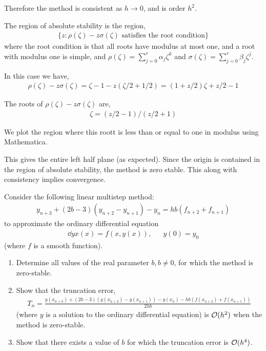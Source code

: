 \documentclass[10pt]{article}
\begin{document}
\begin{solution}[Solution]
\begin{itemize}
Therefore the method is consistent as \( h\to 0 \), and is order \( h^2 \).

The region of absolute stability is the region,
\begin{align*}
    \{ z : \rho(\zeta) - z\sigma(\zeta) \text{ satisfies the root condition} \}
\end{align*}
    where the root condition is that all roots have modulus at most one, and a root with modulus one is simple, and \( \rho(\zeta) = \sum_{j=0}^{r} \alpha_j\zeta^k \) and \( \sigma(\zeta) = \sum_{j=0}^{r} \beta_j \zeta^j \).

In this case we have,
\begin{align*}
    \rho(\zeta) - z\sigma(\zeta) =  \zeta -1 - z(\zeta/2+1/2) = (1+z/2)\zeta + z/2-1
\end{align*}

The roots of \( \rho(\zeta) - z\sigma(\zeta) \) are,
\begin{align*}
    \zeta = ( z/2-1 ) / (z/2+1)
\end{align*}

We plot the region where this roott is less than or equal to one in modulus using Mathematica.

This gives the entire left half plane (as expected). Since the origin is contained in the region of absolute stability, the method is zero stable. This along with consistency implies convergence.

\end{itemize}
\end{solution}


\begin{problem}
Consider the following linear multistep method:
\begin{align*}
    y_{n+3} + (2b-3)(y_{n+2}-y_{n+1}) - y_n = hb(f_{n+2}+f_{n+1})
\end{align*}
to approximate the ordinary differential equation
\begin{align*}
    \dd{y}{x}(x) = f(x,y(x)), && y(0) = y_0
\end{align*}
(where \( f \) is a smooth function).

\begin{enumerate}[label=(\alph*),nolistsep]
\item Determine all values of the real parameter \( b, b \neq 0\), for which the
method is zero-stable.
\item Show that the truncation error,
\begin{align*}
    T_n = \frac{y(x_{n+3})+(2b-3)(y(x_{n+2})-y(x_{n+1}))-y(x_n)-hb(f(x_{n+2})+f(x_{n+1}))}{2hb}
\end{align*}
(where \( y \) is a solution to the ordinary differential equation) is \( \mathcal{O}(h^2) \) when the method is zero-stable.
\item Show that there exists a value of \( b \) for which the truncation error is \( \mathcal{O}(h^4) \).
\end{enumerate}
\end{problem}
\end{document}
